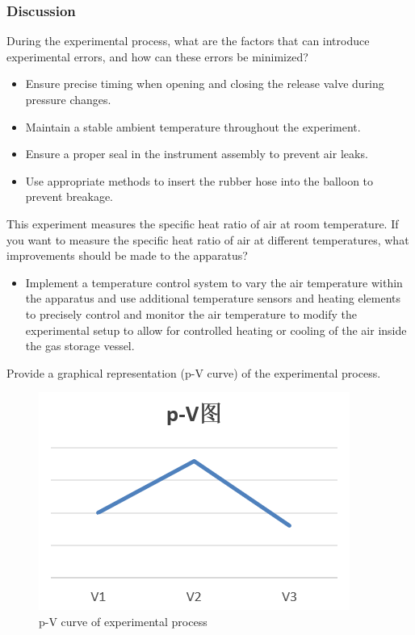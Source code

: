 \documentclass[UTF8]{article}
\begin{document}
	\subsubsection{Discussion}
	During the experimental process, what are the factors that can introduce experimental errors, and how can these errors be minimized?
	
	\begin{itemize}
	\item Ensure precise timing when opening and closing the release valve during pressure changes.
	\item Maintain a stable ambient temperature throughout the experiment.
	\item Ensure a proper seal in the instrument assembly to prevent air leaks.
	\item Use appropriate methods to insert the rubber hose into the balloon to prevent breakage.
	\end{itemize}
	
	This experiment measures the specific heat ratio of air at room temperature. If you want to measure the specific heat ratio of air at different temperatures, what improvements should be made to the apparatus?
	
	\begin{itemize}
	\item Implement a temperature control system to vary the air temperature within the apparatus and use additional temperature sensors and heating elements to precisely control and monitor the air temperature  to modify the experimental setup to allow for controlled heating or cooling of the air inside the gas storage vessel.
	\end{itemize}
	
	Provide a graphical representation (p-V curve) of the experimental process.
		\begin{figure}[H]
	    	\centering
	    	\includegraphics[clip,scale=1,trim={0 0 0 0}]{fig/fig10.png}
	        \caption{p-V curve of experimental process}
	        \label{figure.2}
	            \end{figure}
	
\end{document}
